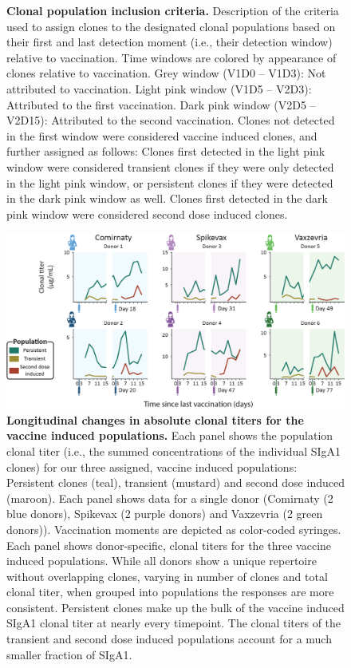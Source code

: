 \begin{subappendices}
\begin{figure}[!htb]
    \caption{\textbf{Clonal population inclusion criteria.} Description of the criteria used to assign clones to the designated clonal populations based on their first and last detection moment (i.e., their detection window) relative to vaccination. Time windows are colored by appearance of clones relative to vaccination. Grey window (V1D0 – V1D3): Not attributed to vaccination. Light pink window (V1D5 – V2D3): Attributed to the first vaccination. Dark pink window (V2D5 – V2D15): Attributed to the second vaccination. Clones not detected in the first window were considered vaccine induced clones, and further assigned as follows: Clones first detected in the light pink window were considered transient clones if they were only detected in the light pink window, or persistent clones if they were detected in the dark pink window as well. Clones first detected in the dark pink window were considered second dose induced clones.}
    \label{fig:figs4.2}
  \end{figure}
  \begin{figure}[!htb]
    \center
    \includegraphics[]{Chapter.4/Figures/fs3.png}
    \caption{\textbf{Longitudinal changes in absolute clonal titers for the vaccine induced populations.} Each panel shows the population clonal titer (i.e., the summed concentrations of the individual SIgA1 clones) for our three assigned, vaccine induced populations: Persistent clones (teal), transient (mustard) and second dose induced (maroon). Each panel shows data for a single donor (Comirnaty (2 blue donors), Spikevax (2 purple donors) and Vaxzevria (2 green donors)). Vaccination moments are depicted as color-coded syringes. Each panel shows donor-specific, clonal titers for the three vaccine induced populations. While all donors show a unique repertoire without overlapping clones, varying in number of clones and total clonal titer, when grouped into populations the responses are more consistent. Persistent clones make up the bulk of the vaccine induced SIgA1 clonal titer at nearly every timepoint. The clonal titers of the transient and second dose induced populations account for a much smaller fraction of SIgA1.}

\end{figure}
\end{subappendices}
